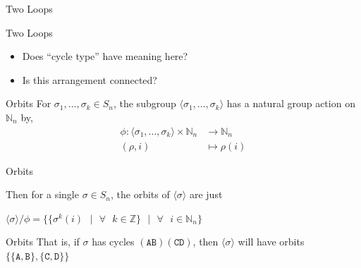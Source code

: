 \documentclass[hyphens,aspectratio=169]{beamer}
\begin{document}
\begin{frame}{Two Loops}
\begin{center}
{
		}

	\end{center}
\end{frame}

\begin{frame}{Two Loops}
	\begin{itemize}
		\item Does ``cycle type'' have meaning here?
		      \pause
		      \vspace{1em}
		\item Is this arrangement connected?
	\end{itemize}
\end{frame}

\begin{frame}{Orbits}
	For $\sigma_1,\dots,\sigma_k\in S_n$, the subgroup $\langle \sigma_1,\dots,\sigma_k \rangle$ has a natural group action on $\mathbb{N}_n$ by,
	\begin{align*}
		\phi: \langle \sigma_1,\dots,\sigma_k \rangle \times \mathbb{N}_n & \to \mathbb{N}_n \\
		(\rho, i)                                                         & \mapsto \rho(i)
	\end{align*}
\end{frame}

\begin{frame}{Orbits}

	Then for a single $\sigma\in S_n$, the orbits of $\langle\sigma\rangle$ are just
	\begin{center}
		$\langle\sigma\rangle/\phi = \{\{\sigma^k(i)\text{ }|\text{ }\forall\text{ }k\in\mathbb{Z}\}\text{ }|\text{ }\forall\text{ }i\in\mathbb{N}_n\}$
	\end{center}

\end{frame}

\begin{frame}{Orbits}
	That is, if $\sigma$ has cycles $(\texttt{AB})(\texttt{CD})$, then $\langle\sigma\rangle$ will have orbits $\{\{\texttt{A},\texttt{B}\},\{\texttt{C},\texttt{D}\}\}$
\end{frame}
\end{document}
